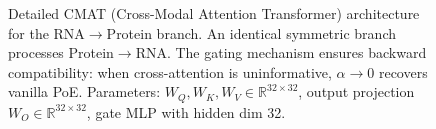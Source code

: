 \documentclass[11pt,a4paper]{article}
\begin{document}
\begin{figure}[!ht]
\caption{Detailed CMAT (Cross-Modal Attention Transformer) architecture for the RNA$\to$Protein branch. An identical symmetric branch processes Protein$\to$RNA. The gating mechanism ensures backward compatibility: when cross-attention is uninformative, $\alpha \to 0$ recovers vanilla PoE. Parameters: $W_Q, W_K, W_V \in \mathbb{R}^{32\times 32}$, output projection $W_O \in \mathbb{R}^{32\times 32}$, gate MLP with hidden dim 32.}
\label{fig:cmat_flow}
\end{figure}
\end{document}
